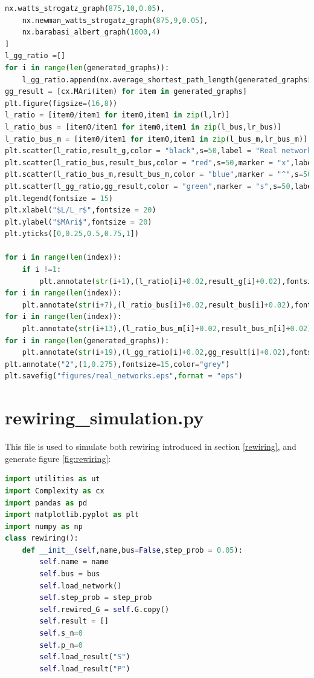 \documentclass[12pt]{article}
\begin{document}
{\begin{lstlisting}[breaklines=true,language=Python]
    nx.watts_strogatz_graph(875,10,0.05),
    nx.newman_watts_strogatz_graph(875,9,0.05),
    nx.barabasi_albert_graph(1000,4)
]
l_gg_ratio =[]
for i in range(len(generated_graphs)):
    l_gg_ratio.append(nx.average_shortest_path_length(generated_graphs[i])/ut.lr(generated_graphs[i]))
gg_result = [cx.MAri(item) for item in generated_graphs]
plt.figure(figsize=(16,8))
l_ratio = [item0/item1 for item0,item1 in zip(l,lr)]
l_ratio_bus = [item0/item1 for item0,item1 in zip(l_bus,lr_bus)]
l_ratio_bus_m = [item0/item1 for item0,item1 in zip(l_bus_m,lr_bus_m)]
plt.scatter(l_ratio,result_g,color = "black",s=50,label = "Real networks")
plt.scatter(l_ratio_bus,result_bus,color = "red",s=50,marker = "x",label ="Bus networks")
plt.scatter(l_ratio_bus_m,result_bus_m,color = "blue",marker = "^",s=50,label = "Modified bus networks")
plt.scatter(l_gg_ratio,gg_result,color = "green",marker = "s",s=50,label = "Generated graphs")
plt.legend(fontsize = 15)
plt.xlabel("$L/L_r$",fontsize = 20)
plt.ylabel("$MAri$",fontsize = 20)
plt.yticks([0,0.25,0.5,0.75,1])

for i in range(len(index)):
    if i !=1:
        plt.annotate(str(i+1),(l_ratio[i]+0.02,result_g[i]+0.02),fontsize= 15,color = "grey")
for i in range(len(index)):
    plt.annotate(str(i+7),(l_ratio_bus[i]+0.02,result_bus[i]+0.02),fontsize= 15,color = "grey")
for i in range(len(index)):
    plt.annotate(str(i+13),(l_ratio_bus_m[i]+0.02,result_bus_m[i]+0.02),fontsize= 15,color = "grey")
for i in range(len(generated_graphs)):
    plt.annotate(str(i+19),(l_gg_ratio[i]+0.02,gg_result[i]+0.02),fontsize= 15,color = "grey")
plt.annotate("2",(1,0.275),fontsize=15,color="grey")
plt.savefig("figures/real_networks.eps",format = "eps")
\end{lstlisting}

\section{rewiring\_simulation.py}
This file is used to simulate both rewiring introduced in section \ref{rewiring}, and generate figure \ref{fig:rewiring}:
\begin{lstlisting}[breaklines=true,language=Python]
import utilities as ut
import Complexity as cx
import pandas as pd
import matplotlib.pyplot as plt
import numpy as np
class rewiring():
    def __init__(self,name,bus=False,step_prob = 0.05):
        self.name = name
        self.bus = bus
        self.load_network()
        self.step_prob = step_prob
        self.rewired_G = self.G.copy()
        self.result = []
        self.s_n=0
        self.p_n=0
        self.load_result("S")
        self.load_result("P")


\end{lstlisting}}
\end{document}
